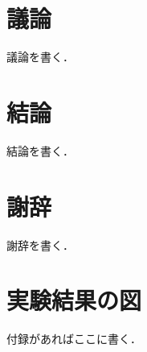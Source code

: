 \documentclass[a4paper, oneside, openany, dvipdfmx]{suribt}%
\begin{document}
\chapter{議論}
議論を書く．

\chapter{結論}
結論を書く．

\backmatter%
\chapter{謝辞}%
謝辞を書く．


\appendix%
\chapter{実験結果の図}
付録があればここに書く．
\end{document}

